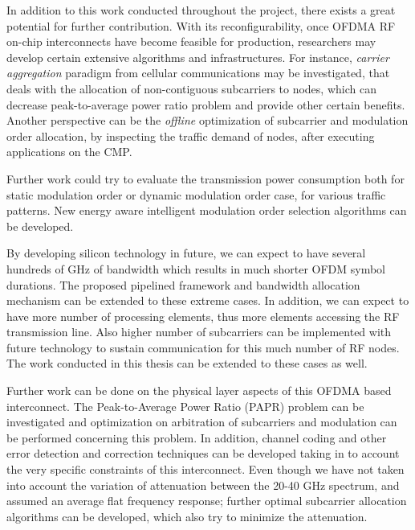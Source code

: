 In addition to this work conducted throughout the project, there exists a great potential for further contribution. With its reconfigurability, once OFDMA RF on-chip interconnects have become feasible for production, researchers may develop certain extensive algorithms and infrastructures. For instance, \textit{carrier aggregation} paradigm from cellular communications may be investigated, that deals with the allocation of non-contiguous subcarriers to nodes, which can decrease peak-to-average power ratio problem and provide other certain benefits. Another perspective can be the \textit{offline} optimization of subcarrier and modulation order allocation, by inspecting the traffic demand of nodes, after executing applications on the CMP. 

Further work could try to evaluate the transmission power consumption both for static modulation order or dynamic modulation order case, for various traffic patterns. New energy aware intelligent modulation order selection algorithms can be developed.

By developing silicon technology in future, we can expect to have several hundreds of GHz of bandwidth which results in much shorter OFDM symbol durations. The proposed pipelined framework and bandwidth allocation mechanism can be extended to these extreme cases. In addition, we can expect to have more number of processing elements, thus more elements accessing the RF transmission line. Also higher number of subcarriers can be implemented with future technology to sustain communication for this much number of RF nodes. The work conducted in this thesis can be extended to these cases as well.  

Further work can be done on the physical layer aspects of this OFDMA based interconnect. The Peak-to-Average Power Ratio (PAPR) problem can be investigated and optimization on arbitration of subcarriers and modulation can be performed concerning this problem. In addition, channel coding and other error detection and correction techniques can be developed taking in to account the very specific constraints of this interconnect. Even though we have not taken into account the variation of attenuation between the 20-40 GHz spectrum, and assumed an average flat frequency response; further optimal subcarrier allocation algorithms can be developed, which also try to minimize the attenuation. 

    
